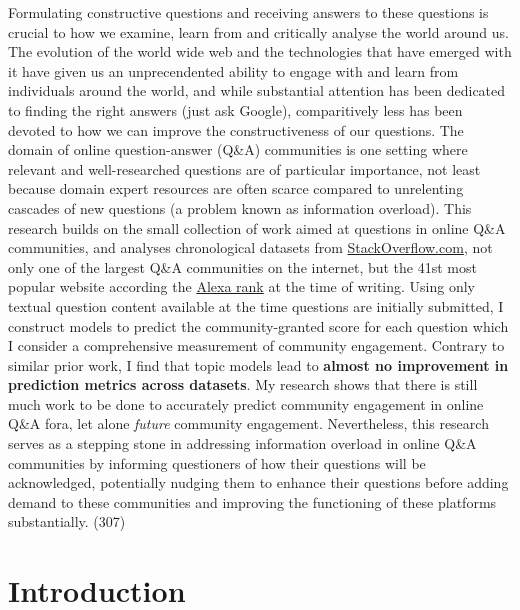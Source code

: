 \documentclass[11pt,preprint, authoryear]{article}
\numberwithin{equation}{section}
\begin{document}
Formulating constructive questions and receiving answers to these
questions is crucial to how we examine, learn from and critically
analyse the world around us. The evolution of the world wide web and the
technologies that have emerged with it have given us an unprecendented
ability to engage with and learn from individuals around the world, and
while substantial attention has been dedicated to finding the right
answers (just ask Google), comparitively less has been devoted to how we
can improve the constructiveness of our questions. The domain of online
question-answer (Q\&A) communities is one setting where relevant and
well-researched questions are of particular importance, not least
because domain expert resources are often scarce compared to unrelenting
cascades of new questions (a problem known as information overload).
This research builds on the small collection of work aimed at questions
in online Q\&A communities, and analyses chronological datasets from
\href{https://stackoverflow.com/}{StackOverflow.com}, not only one of
the largest Q\&A communities on the internet, but the 41st most popular
website according the \href{https://www.alexa.com/topsites}{Alexa rank}
at the time of writing. Using only textual question content available at
the time questions are initially submitted, I construct models to
predict the community-granted score for each question which I consider a
comprehensive measurement of community engagement. Contrary to similar
prior work, I find that topic models lead to \textbf{almost no
improvement in prediction metrics across datasets}. My research shows
that there is still much work to be done to accurately predict community
engagement in online Q\&A fora, let alone \emph{future} community
engagement. Nevertheless, this research serves as a stepping stone in
addressing information overload in online Q\&A communities by informing
questioners of how their questions will be acknowledged, potentially
nudging them to enhance their questions before adding demand to these
communities and improving the functioning of these platforms
substantially. (307)

\clearpage


\newpage

\section{\texorpdfstring{Introduction
\label{Intro}}{Introduction }}\label{introduction}
\end{document}
